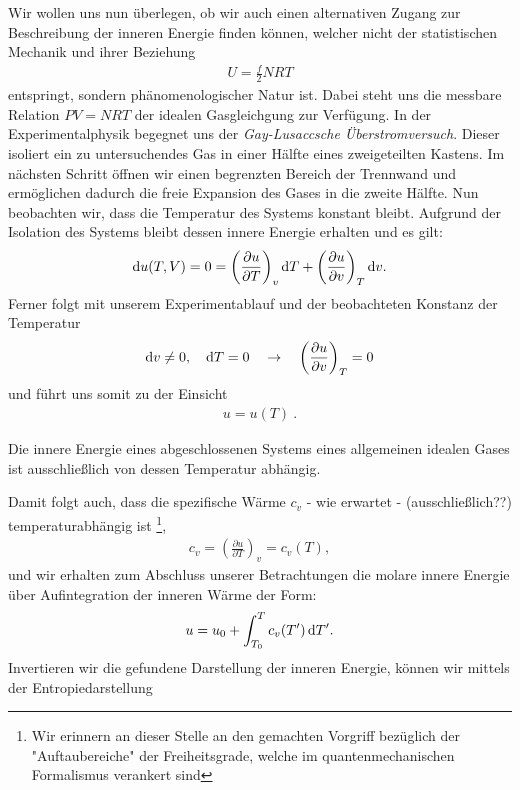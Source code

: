Wir wollen uns nun überlegen, ob wir auch einen alternativen Zugang zur Beschreibung der inneren Energie finden können, welcher nicht der statistischen Mechanik und ihrer Beziehung 
\begin{align*}
    U=\frac{f}{2}NRT
\end{align*}
entspringt, sondern phänomenologischer Natur ist. 
Dabei steht uns die messbare Relation $PV=NRT$ der idealen Gasgleichgung zur Verfügung.
In der Experimentalphysik begegnet uns der \emph{Gay-Lusaccsche Überstromversuch}. Dieser isoliert ein zu untersuchendes Gas in einer Hälfte eines zweigeteilten Kastens. Im nächsten Schritt öffnen wir einen begrenzten Bereich der Trennwand und ermöglichen dadurch die freie Expansion des Gases in die zweite Hälfte. Nun beobachten wir, dass die Temperatur des Systems konstant bleibt. 
Aufgrund der Isolation des Systems bleibt dessen innere Energie erhalten und es gilt: 
\begin{align*}
    \mathop{}\!\mathrm{d} u(T,V)=0=\left(\frac{\partial u}{\partial T}\right)_v\mathop{}\!\mathrm{d} T+\left(\frac{\partial u}{\partial v}\right)_T\mathop{}\!\mathrm{d} v.
\end{align*}
Ferner folgt mit unserem Experimentablauf und der beobachteten Konstanz der Temperatur 
\begin{align*}
    \mathop{}\!\mathrm{d} v \neq 0,\quad\mathop{}\!\mathrm{d} T=0\quad\rightarrow\quad \left(\frac{\partial u}{\partial v}\right)_T=0
\end{align*}
und führt uns somit zu der Einsicht 
\begin{align*}
    \boxed{u=u(T)}\:.
\end{align*}
\begin{formal}
    Die innere Energie eines abgeschlossenen Systems eines allgemeinen idealen Gases ist ausschließlich von dessen Temperatur abhängig.   
\end{formal}
Damit folgt auch, dass die spezifische Wärme $c_v$ - wie erwartet - (ausschließlich??) temperaturabhängig ist \footnote{Wir erinnern an dieser Stelle an den gemachten Vorgriff bezüglich der "Auftaubereiche" der Freiheitsgrade, welche im quantenmechanischen Formalismus verankert sind},
\begin{align*}
    c_v=\left(\frac{\partial u}{\partial T}\right)_v=c_v(T),
\end{align*}
und wir erhalten zum Abschluss unserer Betrachtungen die molare innere Energie über Aufintegration der inneren Wärme der Form: 
\begin{align*}
    u=u_0+\int_{T_0}^Tc_v(T')\mathop{}\!\mathrm{d} T'.
\end{align*}
Invertieren wir die gefundene Darstellung der inneren Energie, können wir mittels der Entropiedarstellung 
